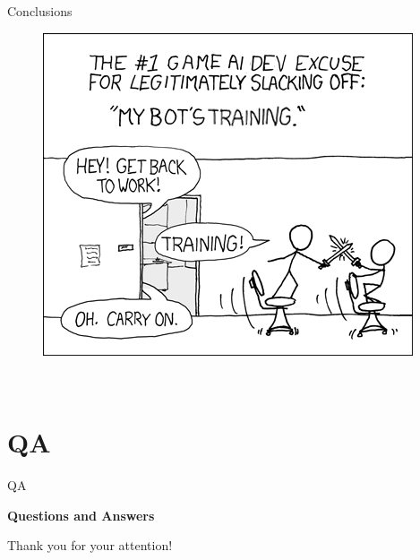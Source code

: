 \documentclass{beamer}
\begin{document}
\begin{frame}{Conclusions}
\begin{figure}[h]
\begin{minipage}[t]{0.55\textwidth}
		\includegraphics[width=\textwidth]{img/training}	   
	\end{minipage}
\end{figure}
\begin{flushright}
			 \\
			\vspace*{-0.2cm}			
\end{flushright}	
\end{frame}

\section{QA}
\begin{frame}{QA}
	\begin{center}
    \bfseries
    \large
    Questions and Answers
    
    \vspace*{1.9cm}			
    Thank you for your attention!
  	\end{center}
\end{frame}
\end{document}
